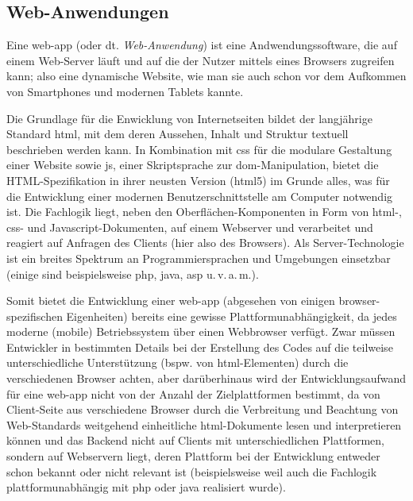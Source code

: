 \subsection{Web-Anwendungen}

Eine \gls{web-app} (oder dt. \emph{Web-Anwendung}) ist eine Andwendungssoftware, die auf einem Web-Server läuft und auf die der Nutzer mittels eines Browsers zugreifen kann; also eine dynamische Website, wie man sie auch schon vor dem Aufkommen von Smartphones und modernen Tablets kannte. 

Die Grundlage für die Enwicklung von Internetseiten bildet der langjährige Standard \gls{html}, mit dem deren Aussehen, Inhalt und Struktur textuell beschrieben werden kann. 
In Kombination mit \gls{css} für die modulare Gestaltung einer Website sowie \gls{js}, einer Skriptsprache zur \gls{dom}-Manipulation, bietet die HTML-Spezifikation in ihrer neusten Version (\gls{html}5) im Grunde alles, was für die Entwicklung einer modernen Benutzerschnittstelle am Computer notwendig ist. 
Die Fachlogik liegt, neben den Oberflächen-Komponenten in Form von \mbox{\gls{html}-,} \gls{css}- und Javascript-Dokumenten, auf einem Webserver und verarbeitet und reagiert auf Anfragen des Clients (hier also des Browsers).
Als Server-Technologie ist ein breites Spektrum an Programmiersprachen und Umgebungen einsetzbar (einige sind beispielsweise \gls{php}, \gls{java}, \gls{asp} u.\,v.\,a.\,m.).

Somit bietet die Entwicklung einer \gls{web-app} (abgesehen von einigen browser-spezifischen Eigenheiten) bereits eine gewisse Plattformunabhängigkeit, da jedes moderne (mobile) Betriebssystem über einen Webbrowser verfügt. 
Zwar müssen Entwickler in bestimmten Details bei der Erstellung des Codes auf die teilweise unterschiedliche Unterstützung (bspw. von \gls{html}-Elementen) durch die verschiedenen Browser achten, aber darüberhinaus wird der Entwicklungsaufwand für eine \gls{web-app} nicht von der Anzahl der Zielplattformen bestimmt, da von Client-Seite aus verschiedene Browser durch die Verbreitung und Beachtung von Web-Standards weitgehend einheitliche \gls{html}-Dokumente lesen und interpretieren können und das Backend nicht auf Clients mit unterschiedlichen Plattformen, sondern auf Webservern liegt, deren Plattform bei der Entwicklung entweder schon bekannt oder nicht relevant ist (beispielsweise weil auch die Fachlogik plattformunabhängig mit \gls{php} oder \gls{java} realisiert wurde).

